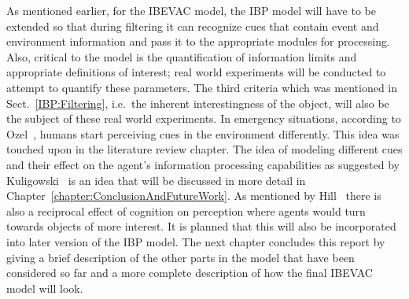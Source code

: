 As mentioned earlier, for the IBEVAC model, the IBP model will have to be extended so that during filtering it can recognize cues that contain event and environment information and pass it to the appropriate modules for processing. Also, critical to the model is the quantification of information limits and appropriate definitions of interest; real world experiments will be conducted to attempt to quantify these parameters. The third criteria which was mentioned in Sect.~\ref{IBP:Filtering}, i.e.\ the inherent interestingness of the object, will also be the subject of these real world experiments. In emergency situations, according to Ozel~\cite{Ozel:2001tn}, humans start perceiving cues in the environment differently. This idea was touched upon in the literature review chapter. The idea of modeling different cues and their effect on the agent's information processing capabilities as suggested by Kuligowski~\cite{Kuligowski:2009un} is an idea that will be discussed in more detail in Chapter~\ref{chapter:ConclusionAndFutureWork}. As mentioned by Hill~\cite{Hill:1999ww} there is also a reciprocal effect of cognition on perception where agents would turn towards objects of more interest. It is planned that this will also be incorporated into later version of the IBP model. The next chapter concludes this report by giving a brief description of the other parts in the model that have been considered so far and a more complete description of how the final IBEVAC model will look.



